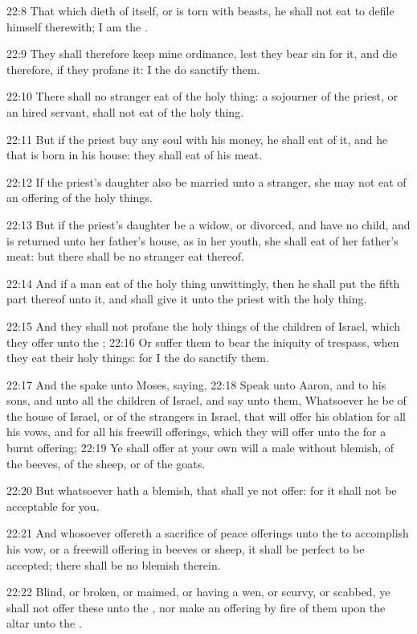 22:8 That which dieth of itself, or is torn with beasts, he shall not eat to defile himself therewith; I am the \LORD.

22:9 They shall therefore keep mine ordinance, lest they bear sin for it, and die therefore, if they profane it: I the \LORD do sanctify them.

22:10 There shall no stranger eat of the holy thing: a sojourner of the priest, or an hired servant, shall not eat of the holy thing.

22:11 But if the priest buy any soul with his money, he shall eat of it, and he that is born in his house: they shall eat of his meat.

22:12 If the priest's daughter also be married unto a stranger, she may not eat of an offering of the holy things.

22:13 But if the priest's daughter be a widow, or divorced, and have no child, and is returned unto her father's house, as in her youth, she shall eat of her father's meat: but there shall be no stranger eat thereof.

22:14 And if a man eat of the holy thing unwittingly, then he shall put the fifth part thereof unto it, and shall give it unto the priest with the holy thing.

22:15 And they shall not profane the holy things of the children of Israel, which they offer unto the \LORD; 22:16 Or suffer them to bear the iniquity of trespass, when they eat their holy things: for I the \LORD do sanctify them.

22:17 And the \LORD spake unto Moses, saying, 22:18 Speak unto Aaron, and to his sons, and unto all the children of Israel, and say unto them, Whatsoever he be of the house of Israel, or of the strangers in Israel, that will offer his oblation for all his vows, and for all his freewill offerings, which they will offer unto the \LORD for a burnt offering; 22:19 Ye shall offer at your own will a male without blemish, of the beeves, of the sheep, or of the goats.

22:20 But whatsoever hath a blemish, that shall ye not offer: for it shall not be acceptable for you.

22:21 And whosoever offereth a sacrifice of peace offerings unto the \LORD to accomplish his vow, or a freewill offering in beeves or sheep, it shall be perfect to be accepted; there shall be no blemish therein.

22:22 Blind, or broken, or maimed, or having a wen, or scurvy, or scabbed, ye shall not offer these unto the \LORD, nor make an offering by fire of them upon the altar unto the \LORD.

